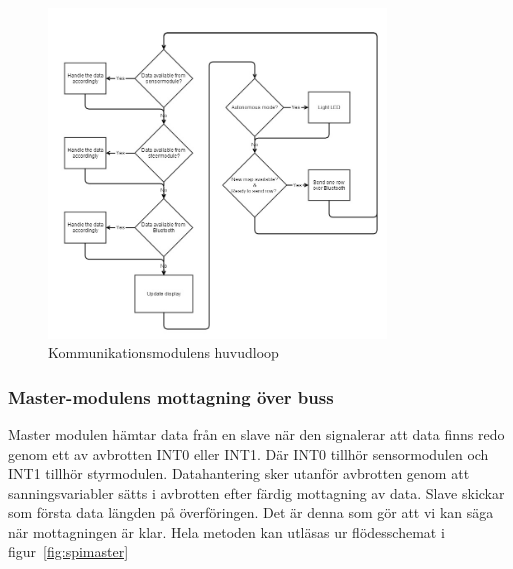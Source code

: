 \documentclass[a4paper,12pt,fleqn]{article}
\begin{document}
\begin{figure}[htp] %
  \begin{center}
  \includegraphics[keepaspectratio=true,width=0.8\textwidth]{bilder/mainmaster.jpg}  %
  \end{center}
  \caption{Kommunikationsmodulens huvudloop} %
  \label{fig:mainmaster}
\end{figure}



\subsubsection{Master-modulens mottagning över buss}

Master modulen hämtar data från en slave när den signalerar att data finns redo genom ett av avbrotten INT0 eller INT1. Där INT0 tillhör sensormodulen och INT1 tillhör styrmodulen. Datahantering sker utanför avbrotten genom att sanningsvariabler sätts i avbrotten efter färdig mottagning av data.
Slave skickar som första data längden på överföringen. Det är denna som gör att vi kan säga när mottagningen är klar. Hela metoden kan utläsas ur flödesschemat i figur~\ref{fig:spimaster}
\end{document}
